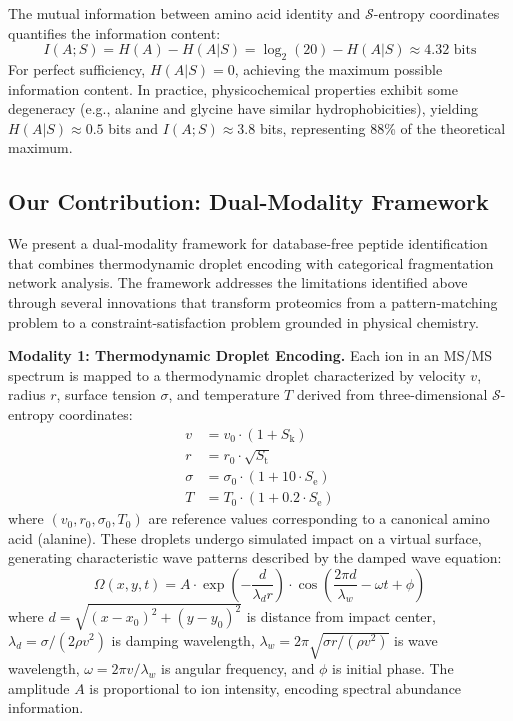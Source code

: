 \documentclass[11pt,twocolumn]{article}
\newcommand{\sentropy}{$\mathcal{S}$-entropy}
\newcommand{\Sk}{S_{\text{k}}}
\newcommand{\St}{S_{\text{t}}}
\newcommand{\Se}{S_{\text{e}}}
\newcommand{\msms}{MS/MS}
\begin{document}
The mutual information between amino acid identity and \sentropy{} coordinates quantifies the information content:
\begin{equation}
    I(A; S) = H(A) - H(A | S) = \log_2(20) - H(A | S) \approx 4.32 \text{ bits}
\end{equation}
For perfect sufficiency, $H(A | S) = 0$, achieving the maximum possible information content. In practice, physicochemical properties exhibit some degeneracy (e.g., alanine and glycine have similar hydrophobicities), yielding $H(A | S) \approx 0.5$ bits and $I(A; S) \approx 3.8$ bits, representing 88\% of the theoretical maximum.

\subsection{Our Contribution: Dual-Modality Framework}

We present a dual-modality framework for database-free peptide identification that combines thermodynamic droplet encoding with categorical fragmentation network analysis. The framework addresses the limitations identified above through several innovations that transform proteomics from a pattern-matching problem to a constraint-satisfaction problem grounded in physical chemistry.

\textbf{Modality 1: Thermodynamic Droplet Encoding.} Each ion in an \msms{} spectrum is mapped to a thermodynamic droplet characterized by velocity $v$, radius $r$, surface tension $\sigma$, and temperature $T$ derived from three-dimensional \sentropy{} coordinates:
\begin{align}
    v &= v_0 \cdot (1 + \Sk) \\
    r &= r_0 \cdot \sqrt{\St} \\
    \sigma &= \sigma_0 \cdot (1 + 10 \cdot \Se) \\
    T &= T_0 \cdot (1 + 0.2 \cdot \Se)
\end{align}
where $(v_0, r_0, \sigma_0, T_0)$ are reference values corresponding to a canonical amino acid (alanine). These droplets undergo simulated impact on a virtual surface, generating characteristic wave patterns described by the damped wave equation:
\begin{equation}
    \Omega(x, y, t) = A \cdot \exp\left(-\frac{d}{\lambda_d r}\right) \cdot \cos\left(\frac{2\pi d}{\lambda_w} - \omega t + \phi\right)
\end{equation}
where $d = \sqrt{(x - x_0)^2 + (y - y_0)^2}$ is distance from impact center, $\lambda_d = \sigma/(2\rho v^2)$ is damping wavelength, $\lambda_w = 2\pi\sqrt{\sigma r/(\rho v^2)}$ is wave wavelength, $\omega = 2\pi v/\lambda_w$ is angular frequency, and $\phi$ is initial phase. The amplitude $A$ is proportional to ion intensity, encoding spectral abundance information.
\end{document}
